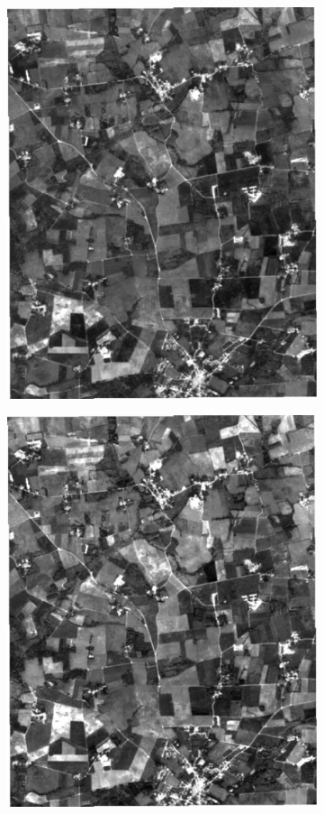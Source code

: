 \documentclass[journal,article,submit,pdftex,moreauthors]{Definitions/mdpi}
\begin{document}
\begin{figure}[H]
\begin{subfigure}[t]{0.23\linewidth}
	  \includegraphics[height=\linewidth,width=0.95\linewidth]{figures/reconstruction_errors/reconstruction_B2_AEs1.pdf}
	\caption{}
	\label{fig:r_aes_b2_1}
	\end{subfigure}
	\begin{subfigure}[t]{0.23\linewidth}
		\centering
		\includegraphics[height=\linewidth,width=0.95\linewidth]{figures/reconstruction_errors/reconstruction_B2_AEs2.pdf}

\end{subfigure}
\end{figure}
\end{document}
